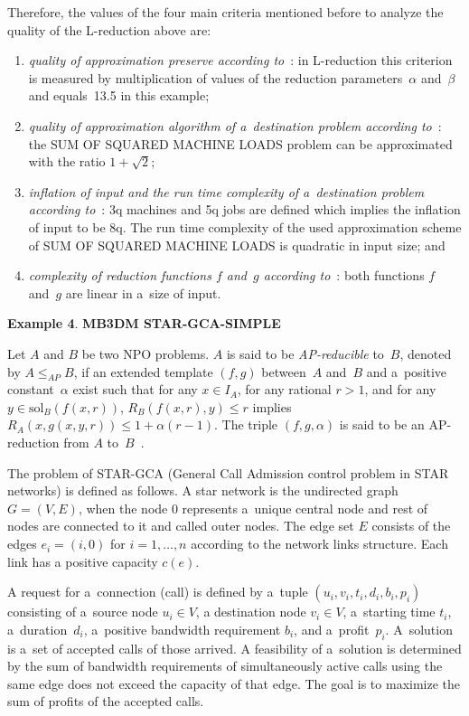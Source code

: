 \begin{multicols}{2}
Therefore, the values of the four main criteria mentioned
before to analyze the quality of the L-reduction above are:
\begin{enumerate}[(1)]
\item {\it quality of approximation preserve according
to}~\cite{AERW2002}: in L-reduction this criterion is measured by
multiplication of values of the reduction parameters~$\alpha$ and~$\beta$
and equals~13.5 in this example;
\item {\it quality of approximation algorithm of a~destination
problem according to}~\cite{AAGKKV}: the {SUM OF SQUARED MACHINE
LOADS} problem can be approximated with the ratio $1+\sqrt{2}$;
\item {\it inflation of input and the run time complexity of a~destination problem according
to}~\cite{AERW2002}: 3q
machines and 5q jobs are defined  which implies the inflation of input to be 8q.
The run time complexity of the used approximation scheme of {SUM
OF SQUARED MACHINE
LOADS} is quadratic in input size; and
\item {\it complexity of reduction functions $f$ and~$g$
according to}~\cite{AERW2002}: both functions $f$ and~$g$ are linear
in a~size of input.
\end{enumerate}

\smallskip

\noindent
\textbf{Example 4}.
\textbf{MB3DM {} STAR-GCA-SIMPLE}

\smallskip

\noindent
Let $A$ and $B$ be two NPO problems. $A$ is said to be
\textit{AP-reducible} to~$B$, denoted by $A\leq_{AP}B$, if an
extended template $(f,g)$ between~$A$ and~$B$ and a~positive
constant~$\alpha$ exist such that for any $x \in I_{A}$, for any
rational $r> 1$, and for any $y \in \mathrm{sol}_{B}(f(x,r))$,
$R_{B}(f(x,r),y) \leq r$ implies $R_{A}(x,g(x,y,r)) \leq 1 +
\alpha(r-1)$. The triple $(f,g,\alpha)$ is said to be an
AP-reduction from $A$ to~$B$~\cite{TrevisanLuca}.

The problem of {STAR-GCA} (General Call Admission control
problem in STAR networks) is defined as follows. A star network is
the undirected graph $G=(V,E)$, when the node $0$ represents a~unique
central node and rest of nodes are connected to it and called outer
nodes. The edge set $E$ consists of the edges $e_i=(i,0)$ for
$i=1,\ldots,n$ according to the network links structure. Each link has
a positive capacity $c(e)$.

A request for a~connection ({call}) is defined by a~tuple
$(u_i,v_i,t_i,d_i,b_i,p_i)$ consisting of a~source node $u_i \in V$,
a destination node $v_i \in V$, a~starting time $t_i$,
a~duration~$d_i$, a~positive bandwidth requirement $b_i$, and a~profit~$p_i$.
A~solution is a~set of accepted calls of those arrived. A feasibility
of a~solution is determined by the sum of bandwidth requirements of
simultaneously active calls using the same edge does not exceed the
capacity of that edge. The goal is to maximize the sum of profits of
the accepted calls.


\end{multicols}

